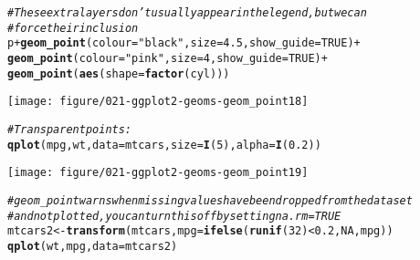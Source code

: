 \documentclass[a4paper,titlepage]{tufte-handout}\usepackage[]{graphicx}\usepackage[]{color}
\makeatletter
\def\maxwidth{ %
  \ifdim\Gin@nat@width>\linewidth
    \linewidth
  \else
    \Gin@nat@width
  \fi
}
\newcommand{\hlnum}[1]{\textcolor[rgb]{0.686,0.059,0.569}{#1}}%
\newcommand{\hlstr}[1]{\textcolor[rgb]{0.192,0.494,0.8}{#1}}%
\newcommand{\hlcom}[1]{\textcolor[rgb]{0.678,0.584,0.686}{\textit{#1}}}%
\newcommand{\hlopt}[1]{\textcolor[rgb]{0,0,0}{#1}}%
\newcommand{\hlstd}[1]{\textcolor[rgb]{0.345,0.345,0.345}{#1}}%
\newcommand{\hlkwb}[1]{\textcolor[rgb]{0.69,0.353,0.396}{#1}}%
\newcommand{\hlkwc}[1]{\textcolor[rgb]{0.333,0.667,0.333}{#1}}%
\newcommand{\hlkwd}[1]{\textcolor[rgb]{0.737,0.353,0.396}{\textbf{#1}}}%
\newenvironment{kframe}{%
 \def\at@end@of@kframe{}%
 \ifinner\ifhmode%
  \def\at@end@of@kframe{\end{minipage}}%
  \begin{minipage}{\columnwidth}%
 \fi\fi%
 \def\FrameCommand##1{\hskip\@totalleftmargin \hskip-\fboxsep
 \colorbox{shadecolor}{##1}\hskip-\fboxsep
     \hskip-\linewidth \hskip-\@totalleftmargin \hskip\columnwidth}%
 \MakeFramed {\advance\hsize-\width
   \@totalleftmargin\z@ \linewidth\hsize
   \@setminipage}}%
 {\par\unskip\endMakeFramed%
 \at@end@of@kframe}
\newenvironment{knitrout}{}{} %
\makeatother
\begin{document}
\begin{knitrout}
\begin{kframe}\begin{alltt}
\hlcom{# These extra layers don't usually appear in the legend, but we can}
\hlcom{# force their inclusion}
\hlstd{p} \hlopt{+} \hlkwd{geom_point}\hlstd{(}\hlkwc{colour}\hlstd{=}\hlstr{"black"}\hlstd{,} \hlkwc{size} \hlstd{=} \hlnum{4.5}\hlstd{,} \hlkwc{show_guide} \hlstd{=} \hlnum{TRUE}\hlstd{)} \hlopt{+}
  \hlkwd{geom_point}\hlstd{(}\hlkwc{colour}\hlstd{=}\hlstr{"pink"}\hlstd{,} \hlkwc{size} \hlstd{=} \hlnum{4}\hlstd{,} \hlkwc{show_guide} \hlstd{=} \hlnum{TRUE}\hlstd{)} \hlopt{+}
  \hlkwd{geom_point}\hlstd{(}\hlkwd{aes}\hlstd{(}\hlkwc{shape} \hlstd{=} \hlkwd{factor}\hlstd{(cyl)))}
\end{alltt}
\end{kframe}
\texttt{[image: figure/021-ggplot2-geoms-geom\_point18]} 
\begin{kframe}\begin{alltt}
\hlcom{# Transparent points:}
\hlkwd{qplot}\hlstd{(mpg, wt,} \hlkwc{data} \hlstd{= mtcars,} \hlkwc{size} \hlstd{=} \hlkwd{I}\hlstd{(}\hlnum{5}\hlstd{),} \hlkwc{alpha} \hlstd{=} \hlkwd{I}\hlstd{(}\hlnum{0.2}\hlstd{))}
\end{alltt}
\end{kframe}
\texttt{[image: figure/021-ggplot2-geoms-geom\_point19]} 
\begin{kframe}\begin{alltt}
\hlcom{# geom_point warns when missing values have been dropped from the data set}
\hlcom{# and not plotted, you can turn this off by setting na.rm = TRUE}
\hlstd{mtcars2} \hlkwb{<-} \hlkwd{transform}\hlstd{(mtcars,} \hlkwc{mpg} \hlstd{=} \hlkwd{ifelse}\hlstd{(}\hlkwd{runif}\hlstd{(}\hlnum{32}\hlstd{)} \hlopt{<} \hlnum{0.2}\hlstd{,} \hlnum{NA}\hlstd{, mpg))}
\hlkwd{qplot}\hlstd{(wt, mpg,} \hlkwc{data} \hlstd{= mtcars2)}
\end{alltt}



\end{kframe}
\end{knitrout}
\end{document}
